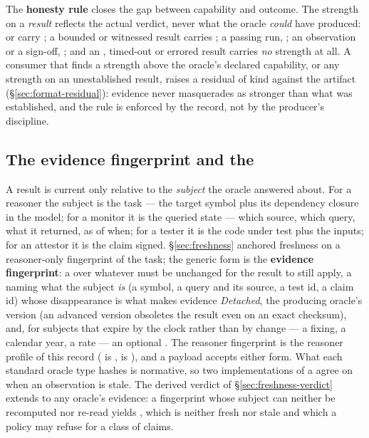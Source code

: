 The \textbf{honesty rule} closes the gap between capability and outcome. The strength on a \emph{result}
reflects the actual verdict, never what the oracle \emph{could} have produced:  or
 carry ; a bounded or witnessed result carries ; a passing run,
; an observation or a sign-off, ; and an , timed-out or errored
result carries \emph{no} strength at all. A consumer that finds a strength above the oracle's declared
capability, or any strength on an unestablished result, raises a  residual of kind
 against the artifact (\S\ref{sec:format-residual}): evidence never masquerades as stronger
than what was established, and the rule is enforced by the record, not by the producer's discipline.

\subsection{The evidence fingerprint and the }\label{sec:oracles-fingerprint}

A result is current only relative to the \emph{subject} the oracle answered about. For a reasoner the
subject is the task --- the target symbol plus its dependency closure in the model; for a monitor it is the
queried state --- which source, which query, what it returned, as of when; for a tester it is the code under
test plus the inputs; for an attestor it is the claim signed. \S\ref{sec:freshness} anchored freshness on a
reasoner-only fingerprint of the task; the generic form is the \textbf{evidence fingerprint}: a
 over whatever must be unchanged for the result to still apply, a
 naming what the subject \emph{is} (a symbol, a query and its source, a test id, a claim
id) whose disappearance is what makes evidence \emph{Detached}, the producing oracle's version (an advanced
version obsoletes the result even on an exact checksum), and, for subjects that expire by the clock rather
than by change --- a fixing, a calendar year, a rate --- an optional . The reasoner
fingerprint is the reasoner profile of this record ( is ,
 is ), and a payload accepts either form. What each standard oracle
type hashes is normative, so two implementations of a  agree on when an observation is stale.
The derived verdict of \S\ref{sec:freshness-verdict} extends to any oracle's evidence: a fingerprint whose
subject can neither be recomputed nor re-read yields , which is neither fresh nor stale and
which a policy may refuse for a class of claims.

